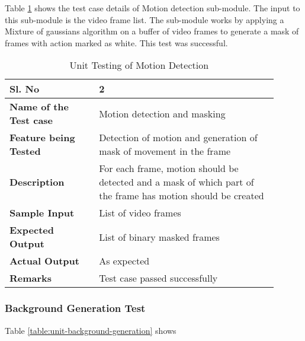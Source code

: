         Table \ref{table:unit-motion-detection} shows the test case details of
        Motion detection sub-module. The input to this sub-module is the video
        frame list. The sub-module works by applying a Mixture of gaussians
        algorithm on a buffer of video frames to generate a mask of frames with
        action marked as white. This test was successful.

        \FloatBarrier
        \begin{table}[H]
            \caption{Unit Testing of Motion Detection}
            \begin{tabular}{|p{0.3\linewidth}|p{0.6\linewidth}|}
                \hline
                \textbf{Sl. No }              &\textbf{ 2}\\
                \hline
                \textbf{Name of the Test case}& Motion detection and masking \\
                \hline
                \textbf{Feature being Tested}  & Detection of motion and
                generation of mask of movement in the frame \\
                \hline
                \textbf{Description}           & For each frame, motion should
                be detected and a mask of which part of the frame has motion
                should be created \\
                \hline
                \textbf{Sample Input}          & List of video frames \\
                \hline
                \textbf{Expected Output}       & List of binary masked
                frames \\
                \hline
                \textbf{Actual Output}         & As expected \\
                \hline
                \textbf{Remarks }              & Test case passed
                successfully \\
                \hline
            \end{tabular}
            \label{table:unit-motion-detection}
        \end{table}


        \subsubsection{Background Generation Test}

        Table \ref{table:unit-background-generation} shows

